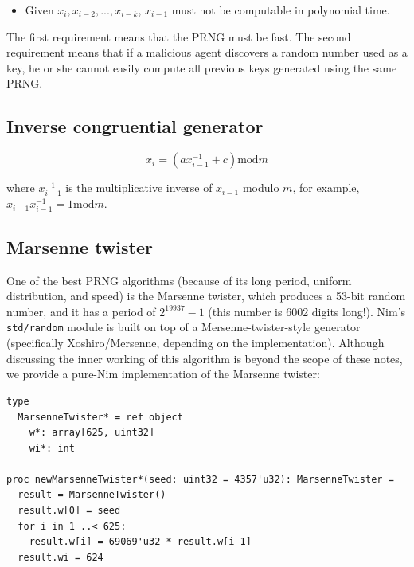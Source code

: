 \documentclass[justified, sixbynine]{tufte-book}
\def\ft{\small\tt}
\theoremstyle{plain}%
\newtheorem * {corollary}{Corollary}
\theoremstyle{definition}
\theoremstyle{remark}
\newtheorem * {remark}{Remark}
\newtheorem * {note}{Note}
\begin{document}
\begin{fullwidth}
\begin{itemize}
\item  Given $x_i, x_{i-2}, ..., x_{i-k}$, $x_{i-1}$ must not be computable in
polynomial time.
\end{itemize}

The first requirement means that the PRNG must be fast. The second
requirement means that if a malicious agent discovers a random number used
as a key, he or she cannot easily compute all previous keys generated using the
same PRNG.

\goodbreak\subsection{Inverse congruential generator}

\begin{equation}
x_i=(ax_{i-1}^{-1}+c)\textrm{mod}m
\end{equation}

where $x_{i-1}^{-1}$ is the multiplicative inverse of $x_{i-1}$ modulo $m$, 
for example, $x_{i-1}x_{i-1}^{-1}=1\textrm{mod}m$.


\goodbreak\subsection{Marsenne twister}

One of the best PRNG algorithms (because of its long period, uniform distribution, and speed) is the Marsenne twister, which produces a 53-bit random number, 
and it has a period of $2^{19937}-1$ (this number is 6002 digits long!).
Nim's {\ft std/random} module is built on top of a Mersenne-twister-style generator (specifically Xoshiro/Mersenne, depending on the implementation).
Although discussing the inner working of this algorithm is beyond the scope of these notes, we provide a
pure-Nim implementation of the Marsenne twister:


\begin{lstlisting}[caption={in file: {\ft nlib.nim}}]
type
  MarsenneTwister* = ref object
    w*: array[625, uint32]
    wi*: int

proc newMarsenneTwister*(seed: uint32 = 4357'u32): MarsenneTwister =
  result = MarsenneTwister()
  result.w[0] = seed
  for i in 1 ..< 625:
    result.w[i] = 69069'u32 * result.w[i-1]
  result.wi = 624


\end{lstlisting}
\end{fullwidth}
\end{document}
